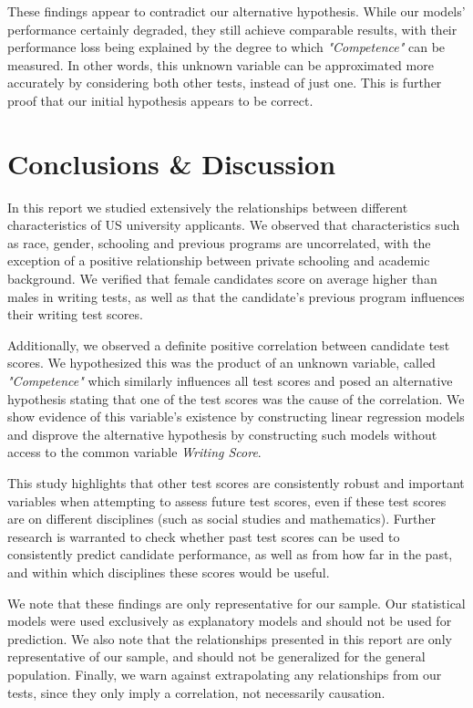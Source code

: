 \documentclass[10pt, a4paper]{article}
\begin{document}
	These findings appear to contradict our alternative hypothesis. While our models' performance certainly degraded, they still achieve comparable results, with their performance loss being explained by the degree to which \textit{"Competence"} can be measured. In other words, this unknown variable can be approximated more accurately by considering both other tests, instead of just one. This is further proof that our initial hypothesis appears to be correct.
	
	
	

	
	\section{Conclusions \& Discussion}
	\label{sec::conclusions}
	
	In this report we studied extensively the relationships between different characteristics of US university applicants. We observed that characteristics such as race, gender, schooling and previous programs are uncorrelated, with the exception of a positive relationship between private schooling and academic background. We verified that female candidates score on average higher than males in writing tests, as well as that the candidate's previous program influences their writing test scores. 
	
	Additionally, we observed a definite positive correlation between candidate test scores. We hypothesized this was the product of an unknown variable, called \textit{"Competence"} which similarly influences all test scores and posed an alternative hypothesis stating that one of the test scores was the cause of the correlation. We show evidence of this variable's existence by constructing linear regression models and disprove the alternative hypothesis by constructing such models without access to the common variable \textit{Writing Score}.
	
	This study highlights that other test scores are consistently robust and important variables when attempting to assess future test scores, even if these test scores are on different disciplines (such as social studies and mathematics). Further research is warranted to check whether past test scores can be used to consistently predict candidate performance, as well as from how far in the past, and within which disciplines these scores would be useful.
	
	We note that these findings are only representative for our sample. Our statistical models were used exclusively as explanatory models and should not be used for prediction. We also note that the relationships presented in this report are only representative of our sample, and should not be generalized for the general population. Finally, we warn against extrapolating any relationships from our tests, since they only imply a correlation, not necessarily causation.
	
\end{document}
